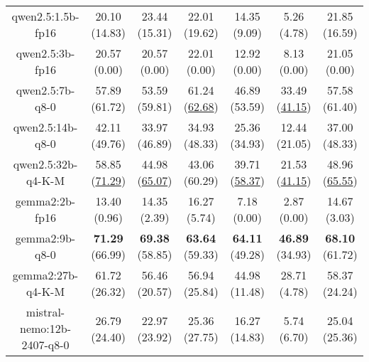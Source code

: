 \begin{table}[hbp]
{\begin{tabular}{ccccccc}
        \multicolumn{1}{c|}{qwen2.5:1.5b-fp16} & 20.10 (14.83) & 23.44 (15.31) & \multicolumn{1}{c|}{22.01 (19.62)} & 14.35 (9.09) & \multicolumn{1}{c|}{5.26 (4.78)} & 21.85 (16.59) \\
        

        \multicolumn{1}{c|}{qwen2.5:3b-fp16} & 20.57 (0.00) & 20.57 (0.00) & \multicolumn{1}{c|}{22.01 (0.00)} & 12.92 (0.00) & \multicolumn{1}{c|}{8.13 (0.00)} & 21.05 (0.00) \\
        

        \multicolumn{1}{c|}{qwen2.5:7b-q8-0} & 57.89 (61.72) & 53.59 (59.81) & \multicolumn{1}{c|}{61.24 (\underline{62.68})} & 46.89 (53.59) & \multicolumn{1}{c|}{33.49 (\underline{41.15})} & 57.58 (61.40) \\
        

        \multicolumn{1}{c|}{qwen2.5:14b-q8-0} & 42.11 (49.76) & 33.97 (46.89) & \multicolumn{1}{c|}{34.93 (48.33)} & 25.36 (34.93) & \multicolumn{1}{c|}{12.44 (21.05)} & 37.00 (48.33) \\
        

        \multicolumn{1}{c|}{qwen2.5:32b-q4-K-M} & 58.85 (\underline{71.29}) & 44.98 (\underline{65.07}) & \multicolumn{1}{c|}{43.06 (60.29)} & 39.71 (\underline{58.37}) & \multicolumn{1}{c|}{21.53 (\underline{41.15})} & 48.96 (\underline{65.55}) \\
        

        \multicolumn{1}{c|}{gemma2:2b-fp16} & 13.40 (0.96) & 14.35 (2.39) & \multicolumn{1}{c|}{16.27 (5.74)} & 7.18 (0.00) & \multicolumn{1}{c|}{2.87 (0.00)} & 14.67 (3.03) \\
        

        \multicolumn{1}{c|}{gemma2:9b-q8-0} & \textbf{71.29} (66.99) & \textbf{69.38} (58.85) & \multicolumn{1}{c|}{\textbf{63.64} (59.33)} & \textbf{64.11} (49.28) & \multicolumn{1}{c|}{\textbf{46.89} (34.93)} & \textbf{68.10} (61.72) \\
        

        \multicolumn{1}{c|}{gemma2:27b-q4-K-M} & 61.72 (26.32) & 56.46 (20.57) & \multicolumn{1}{c|}{56.94 (25.84)} & 44.98 (11.48) & \multicolumn{1}{c|}{28.71 (4.78)} & 58.37 (24.24) \\
        

        \multicolumn{1}{c|}{mistral-nemo:12b-2407-q8-0} & 26.79 (24.40) & 22.97 (23.92) & \multicolumn{1}{c|}{25.36 (27.75)} & 16.27 (14.83) & \multicolumn{1}{c|}{5.74 (6.70)} & 25.04 (25.36) \\
        

\end{tabular}}
\end{table}

